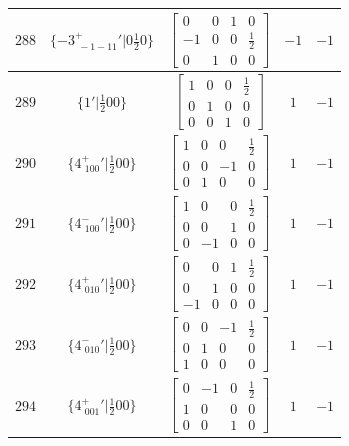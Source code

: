 \documentclass[fleqn,8pt]{jsarticle}
\begin{document}
\begin{longtable}{ccccc}
$ 288 $ & $ \{-3^{+}_{\,\,-1-11}{}'|0 \frac{1}{2} 0\} $ & $ \begin{bmatrix} 0 & 0 & 1 & 0 \\ -1 & 0 & 0 & \frac{1}{2} \\ 0 & 1 & 0 & 0 \end{bmatrix} $ & $ -1 $ & $ -1 $ \\ \hline
$ 289 $ & $ \{1{}'|\frac{1}{2} 0 0\} $ & $ \begin{bmatrix} 1 & 0 & 0 & \frac{1}{2} \\ 0 & 1 & 0 & 0 \\ 0 & 0 & 1 & 0 \end{bmatrix} $ & $ 1 $ & $ -1 $ \\ \hline
$ 290 $ & $ \{4^{+}_{\,\,100}{}'|\frac{1}{2} 0 0\} $ & $ \begin{bmatrix} 1 & 0 & 0 & \frac{1}{2} \\ 0 & 0 & -1 & 0 \\ 0 & 1 & 0 & 0 \end{bmatrix} $ & $ 1 $ & $ -1 $ \\ \hline
$ 291 $ & $ \{4^{-}_{\,\,100}{}'|\frac{1}{2} 0 0\} $ & $ \begin{bmatrix} 1 & 0 & 0 & \frac{1}{2} \\ 0 & 0 & 1 & 0 \\ 0 & -1 & 0 & 0 \end{bmatrix} $ & $ 1 $ & $ -1 $ \\ \hline
$ 292 $ & $ \{4^{+}_{\,\,010}{}'|\frac{1}{2} 0 0\} $ & $ \begin{bmatrix} 0 & 0 & 1 & \frac{1}{2} \\ 0 & 1 & 0 & 0 \\ -1 & 0 & 0 & 0 \end{bmatrix} $ & $ 1 $ & $ -1 $ \\ \hline
$ 293 $ & $ \{4^{-}_{\,\,010}{}'|\frac{1}{2} 0 0\} $ & $ \begin{bmatrix} 0 & 0 & -1 & \frac{1}{2} \\ 0 & 1 & 0 & 0 \\ 1 & 0 & 0 & 0 \end{bmatrix} $ & $ 1 $ & $ -1 $ \\ \hline
$ 294 $ & $ \{4^{+}_{\,\,001}{}'|\frac{1}{2} 0 0\} $ & $ \begin{bmatrix} 0 & -1 & 0 & \frac{1}{2} \\ 1 & 0 & 0 & 0 \\ 0 & 0 & 1 & 0 \end{bmatrix} $ & $ 1 $ & $ -1 $ \\ \hline

\end{longtable}
\end{document}
